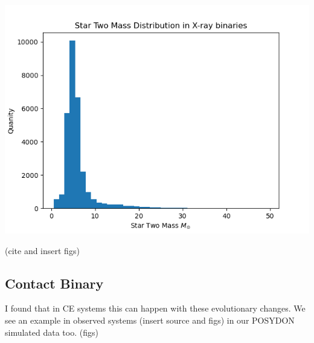 \documentclass[12pt, letterpaper]{article}
\begin{document}
\begin{center}
            \includegraphics[scale=.6]{Figs/X-ray binaries Star Two Mass Distribution.png}
            
        \end{center}
        (cite and insert figs)
      
        \subsection{\centering Contact Binary}
        I found that in CE systems this can happen with these evolutionary changes. We see an example in observed systems (insert source and figs) in our POSYDON \cite{Fragos_2023} simulated data too. (figs)
\end{document}
